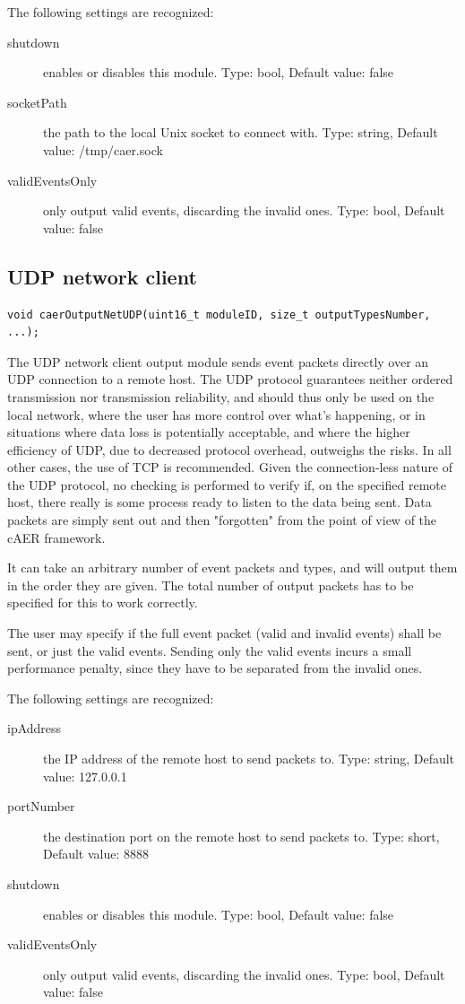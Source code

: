 \documentclass[a4paper,12pt]{report}
\begin{document}
The following settings are recognized:
\begin{description}
\item[shutdown] enables or disables this module.
\subitem Type: bool, Default value: false
\item[socketPath] the path to the local Unix socket to connect with.
\subitem Type: string, Default value: /tmp/caer.sock
\item[validEventsOnly] only output valid events, discarding the invalid ones.
\subitem Type: bool, Default value: false
\end{description}
\clearpage
\subsection{UDP network client} \label{subsec:udp_network_client}

\begin{lstlisting}
void caerOutputNetUDP(uint16_t moduleID, size_t outputTypesNumber, ...);
\end{lstlisting}

The UDP network client output module sends event packets directly over an UDP connection to a remote host.
The UDP protocol guarantees neither ordered transmission nor transmission reliability, and should thus only be used on the local network, where the user has more control over what's happening, or in situations where data loss is potentially acceptable, and where the higher efficiency of UDP, due to decreased protocol overhead, outweighs the risks. In all other cases, the use of TCP is recommended.
Given the connection-less nature of the UDP protocol, no checking is performed to verify if, on the specified remote host, there really is some process ready to listen to the data being sent. Data packets are simply sent out and then "forgotten" from the point of view of the cAER framework.

It can take an arbitrary number of event packets and types, and will output them in the order they are given. The total number of output packets has to be specified for this to work correctly.

The user may specify if the full event packet (valid and invalid events) shall be sent, or just the valid events. Sending only the valid events incurs a small performance penalty, since they have to be separated from the invalid ones.

The following settings are recognized:
\begin{description}
\item[ipAddress] the IP address of the remote host to send packets to.
\subitem Type: string, Default value: 127.0.0.1
\item[portNumber] the destination port on the remote host to send packets to.
\subitem Type: short, Default value: 8888
\item[shutdown] enables or disables this module.
\subitem Type: bool, Default value: false
\item[validEventsOnly] only output valid events, discarding the invalid ones.
\subitem Type: bool, Default value: false
\end{description}
\end{document}
